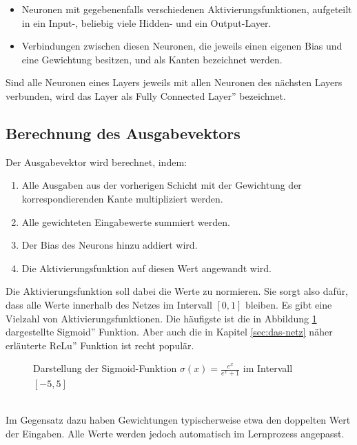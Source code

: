 \documentclass[11pt]{article}
\begin{document}
\begin{itemize}
	\item Neuronen mit gegebenenfalls verschiedenen Aktivierungsfunktionen, aufgeteilt in ein Input-, beliebig viele Hidden- und ein Output-Layer.
	\item Verbindungen zwischen diesen Neuronen, die jeweils einen eigenen Bias und eine Gewichtung besitzen, und als Kanten bezeichnet werden.
\end{itemize}
Sind alle Neuronen eines Layers jeweils mit allen Neuronen des nächsten Layers verbunden, wird das Layer als \glqq Fully Connected Layer'' bezeichnet.
\subsection{Berechnung des Ausgabevektors}
Der Ausgabevektor wird berechnet, indem:
\begin{enumerate}
	\item Alle Ausgaben aus der vorherigen Schicht mit der Gewichtung der korrespondierenden Kante multipliziert werden.
	\item Alle gewichteten Eingabewerte summiert werden.
	\item Der Bias des Neurons hinzu addiert wird.
	\item Die Aktivierungsfunktion auf diesen Wert angewandt wird.
\end{enumerate}
Die Aktivierungsfunktion soll dabei die Werte zu normieren. Sie sorgt also dafür, dass alle Werte innerhalb des Netzes im Intervall $[0, 1]$ bleiben. Es gibt eine Vielzahl von Aktivierungsfunktionen. Die häufigste ist die in Abbildung \ref{Sigmoid} dargestellte \glqq Sigmoid'' Funktion. Aber auch die in Kapitel \ref{sec:das-netz} näher erläuterte \glqq ReLu'' Funktion ist recht populär.
\begin{figure}[h]
\begin{center}
\end{center}
\caption{Darstellung der Sigmoid-Funktion $\sigma(x)=\frac{e^x}{e^x+1}$ im Intervall $[-5, 5]$}
\label{Sigmoid}
\end{figure}
\\
Im Gegensatz dazu haben Gewichtungen typischerweise etwa den doppelten Wert der Eingaben. Alle Werte werden jedoch automatisch im Lernprozess angepasst.
\end{document}
